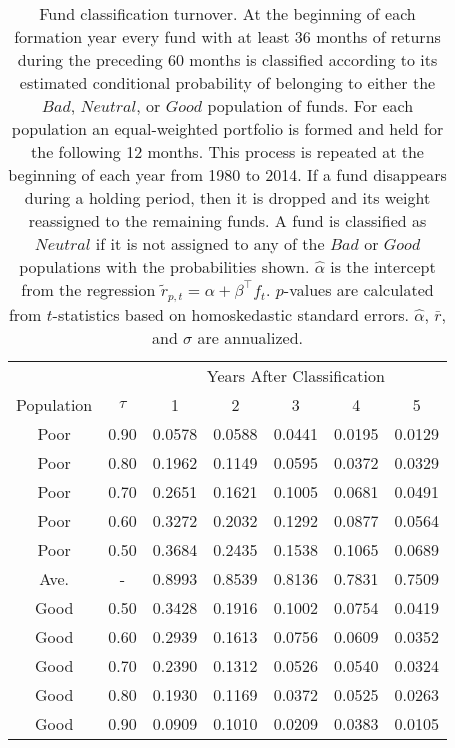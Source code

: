		\begin{table}[p]
			\centering
			\small
			    \begin{tabular}{*{7}{c}}
			    \toprule
			    & & \multicolumn{5}{c}{Years After Classification} \\
			    \cmidrule{3-7}
			    Population & $\tau$ & 1 & 2 & 3 & 4 & 5 \\
			    \midrule
			    Poor & 0.90 & 0.0578 & 0.0588 & 0.0441 & 0.0195 & 0.0129 \\
			    Poor & 0.80 & 0.1962 & 0.1149 & 0.0595 & 0.0372 & 0.0329 \\
			    Poor & 0.70 & 0.2651 & 0.1621 & 0.1005 & 0.0681 & 0.0491 \\
			    Poor & 0.60 & 0.3272 & 0.2032 & 0.1292 & 0.0877 & 0.0564 \\
			    Poor & 0.50 & 0.3684 & 0.2435 & 0.1538 & 0.1065 & 0.0689 \\
			    Ave. & - & 0.8993 & 0.8539 & 0.8136 & 0.7831 & 0.7509 \\
			    Good & 0.50 & 0.3428 & 0.1916 & 0.1002 & 0.0754 & 0.0419 \\
			    Good & 0.60 & 0.2939 & 0.1613 & 0.0756 & 0.0609 & 0.0352 \\
			    Good & 0.70 & 0.2390 & 0.1312 & 0.0526 & 0.0540 & 0.0324 \\
			    Good & 0.80 & 0.1930 & 0.1169 & 0.0372 & 0.0525 & 0.0263 \\
			    Good & 0.90 & 0.0909 & 0.1010 & 0.0209 & 0.0383 & 0.0105 \\
			    \bottomrule
			    \end{tabular}
			\captionsetup{position=below, font=footnotesize, justification=justified, width=0.72\linewidth}
			\caption[Fund classification turnover]{Fund classification turnover. At the beginning of each formation year every fund with at least 36 months of returns during the preceding 60 months is classified according to its estimated conditional probability of belonging to either the $Bad$, $Neutral$, or $Good$ population of funds.  For each population an equal-weighted portfolio is formed and held for the following 12 months.  This process is repeated at the beginning of each year from 1980 to 2014.  If a fund disappears during a holding period, then it is dropped and its weight reassigned to the remaining funds.  A fund is classified as $Neutral$ if it is not assigned to any of the $Bad$ or $Good$ populations with the probabilities shown.  $\hat{\alpha}$ is the intercept from the regression $\tilde{r}_{p,t} = \alpha + \beta^\top f_{t}$.  $p$-values are calculated from $t$-statistics based on homoskedastic standard errors. $\hat{\alpha}$, $\bar{r}$, and $\sigma$ are annualized.}
			\label{tab:turnover}
		\end{table}

